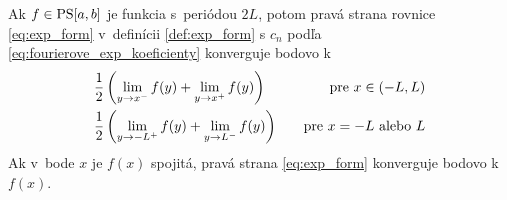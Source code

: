 \begin{veta}
    Ak $f \in \mbox{PS}[a,b]$ je funkcia s~periódou $2L$, potom 
    pravá strana rovnice 
    \eqref{eq:exp_form} v~definícii \ref{def:exp_form} s $c_n$ podľa 
    \eqref{eq:fourierove_exp_koeficienty} konverguje
    bodovo k
    \begin{align*}
        &\frac{1}{2}\left( \lim_{y\rightarrow x^-} f(y) +
                \lim_{y\rightarrow x^+} f(y)\right) \quad &\mbox{pre\ }
                x\in(-L,L) \\
        &\frac{1}{2}\left( \lim_{y\rightarrow -L^+} f(y) +
                \lim_{y\rightarrow L^-} f(y)\right) \quad &\mbox{pre\ }
                x=-L \mbox{\ alebo\ } L            
    \end{align*}
    Ak v~bode $x$ je $f(x)$ spojitá, pravá strana \eqref{eq:exp_form} 
    konverguje bodovo k $f(x)$.
    \label{veta:fourierova_veta}
\end{veta}
